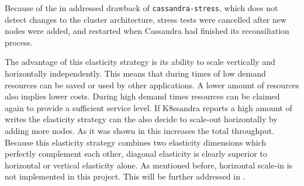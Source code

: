 Because of the in  addressed drawback of \texttt{cassandra-stress}, which does not detect changes to the cluster architecture, stress tests were cancelled after new nodes were added, and restarted when Cassandra had finished its reconsiliation process.

The advantage of this elasticity strategy is its ability to scale vertically and horizontally independently. This means that during times of low demand resources can be saved or used by other applications. A lower amount of resources also implies lower costs. During high demand times resources can be claimed again to provide a sufficient service level. If K8ssandra reports a high amount of writes the elasticity strategy can the also decide to scale-out horizontally by adding more nodes. As it was shown in  this increases the total throughput. Because this elasticity strategy combines two elasticity dimensions which perfectly complement each other, diagonal elasticity is clearly superior to horizontal or vertical elasticity alone. As mentioned before, horizontal scale-in is not implemented in this project. This will be further addressed in .
